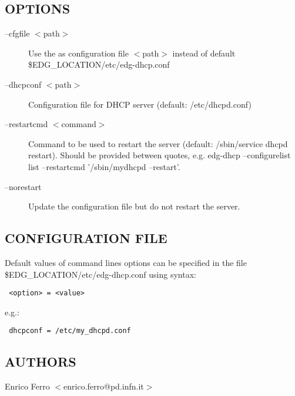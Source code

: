 \subsection*{OPTIONS\label{edg-dhcp_OPTIONS}}
\begin{description}

\item[--cfgfile $<$path$>$] \mbox{}

Use the as configuration file $<$path$>$ instead of default
\$EDG\_LOCATION/etc/edg-dhcp.conf


\item[--dhcpconf $<$path$>$] \mbox{}

Configuration file for DHCP server (default: /etc/dhcpd.conf)


\item[--restartcmd $<$command$>$] \mbox{}

Command to be used to restart the server (default: /sbin/service
dhcpd restart). Should be provided between quotes, e.g.
 edg-dhcp --configurelist list --restartcmd '/sbin/mydhcpd --restart'.


\item[--norestart] \mbox{}

Update the configuration file but do not restart the server.

\end{description}
\subsection*{CONFIGURATION FILE\label{edg-dhcp_CONFIGURATION_FILE}}


Default values of command lines options can be specified in the file
\$EDG\_LOCATION/etc/edg-dhcp.conf using syntax:

\begin{verbatim}
 <option> = <value>
\end{verbatim}


e.g.:

\begin{verbatim}
 dhcpconf = /etc/my_dhcpd.conf
\end{verbatim}
\subsection*{AUTHORS\label{edg-dhcp_AUTHORS}}


Enrico Ferro $<$enrico.ferro@pd.infn.it$>$


